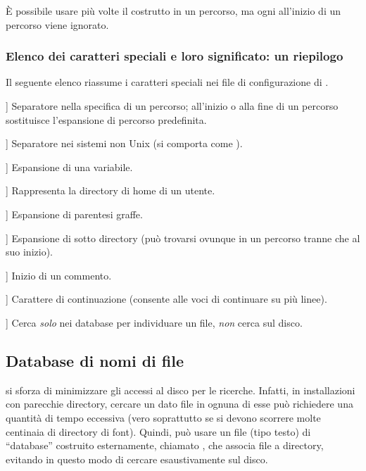 \documentclass{article}
\begin{document}
È possibile usare più volte il costrutto \samp{//} in un percorso, ma ogni
\samp{//} all'inizio di un percorso viene ignorato.

\subsubsection{Elenco dei caratteri speciali e loro significato: un
  riepilogo}

Il seguente elenco riassume i caratteri speciali nei file di
configurazione di \KPS{}.

\newcommand{\CODE}[1]{\makebox[3em][l]{\code{#1}}}
\begin{ttdescription}
\item[\CODE{:}] Separatore nella specifica di un percorso; all'inizio o
  alla fine di un percorso sostituisce l'espansione di percorso
  predefinita.\par
\item[\CODE{;}] Separatore nei sistemi non Unix (si comporta come
  \code{:}).
\item[\CODE{\$}] Espansione di una variabile.
\item[\CODE{\string~}] Rappresenta la directory di home di un utente.
\item[\CODE{\char`\{...\char`\}}] Espansione di parentesi graffe.
\item[\CODE{//}] Espansione di sotto directory (può trovarsi ovunque in un
  percorso tranne che al suo inizio).
\item[\CODE{\%}] Inizio di un commento.
\item[\CODE{\bs}] Carattere di continuazione (consente alle voci di
  continuare su più linee).
\item[\CODE{!!}] Cerca \emph{solo} nei database per individuare un file,
    \emph{non} cerca sul disco.
\end{ttdescription}


\subsection{Database di nomi di file}
\label{sec:filename-database}

\KPS{} si sforza di minimizzare gli accessi al disco per le ricerche.
Infatti, in installazioni con parecchie directory, cercare un dato file
in ognuna di esse può richiedere una quantità di tempo eccessiva (vero
soprattutto se si devono scorrere molte centinaia di directory di
font). Quindi, \KPS{} può usare un file (tipo testo) di ``database'' costruito
esternamente, chiamato , che associa file a directory, evitando
in questo modo di cercare esaustivamente sul disco.
\end{document}
